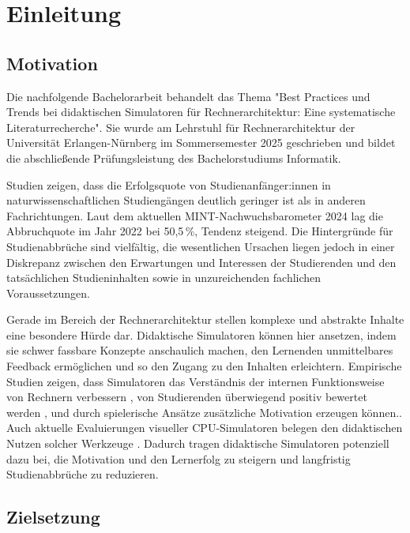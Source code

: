 \chapter{Einleitung}

\section{Motivation}

Die nachfolgende Bachelorarbeit behandelt das Thema "Best Practices und Trends bei didaktischen Simulatoren für Rechnerarchitektur: Eine systematische Literaturrecherche". Sie wurde am Lehrstuhl für Rechnerarchitektur der Universität Erlangen-Nürnberg im Sommersemester 2025 geschrieben und bildet die abschließende Prüfungsleistung des Bachelorstudiums Informatik.

Studien zeigen, dass die Erfolgsquote von Studienanfänger:innen in naturwissenschaftlichen Studiengängen deutlich geringer ist als in anderen Fachrichtungen.\parencite[S. 370]{burdinski_lehrvideos_2024} Laut dem aktuellen MINT-Nachwuchsbarometer 2024 lag die Abbruchquote im Jahr 2022 bei 50,5\,\%, Tendenz steigend. Die Hintergründe für Studienabbrüche sind vielfältig, die wesentlichen Ursachen liegen jedoch in einer Diskrepanz zwischen den Erwartungen und Interessen der Studierenden und den tatsächlichen Studieninhalten sowie in unzureichenden fachlichen Voraussetzungen.\parencite[S. 21]{joachim_herz_stiftung_mint_2024}

Gerade im Bereich der Rechnerarchitektur stellen komplexe und abstrakte Inhalte eine besondere Hürde dar. Didaktische Simulatoren können hier ansetzen, indem sie schwer fassbare Konzepte anschaulich machen, den Lernenden unmittelbares Feedback ermöglichen und so den Zugang zu den Inhalten erleichtern. Empirische Studien zeigen, dass Simulatoren das Verständnis der internen Funktionsweise von Rechnern verbessern \parencite[S. 215]{prasad_using_2015}, von Studierenden überwiegend positiv bewertet werden \parencite[S. 8]{besim_understanding_2012}, und durch spielerische Ansätze zusätzliche Motivation erzeugen können.\parencite[S. 453]{schlag_gamifizierung_2021}. Auch aktuelle Evaluierungen visueller CPU-Simulatoren belegen den didaktischen Nutzen solcher Werkzeuge \parencites[S. 11]{maxnuck_soares_use_2016}[S. 75]{cortinovis_further_2024}. Dadurch tragen didaktische Simulatoren potenziell dazu bei, die Motivation und den Lernerfolg zu steigern und langfristig Studienabbrüche zu reduzieren.

\section{Zielsetzung}

